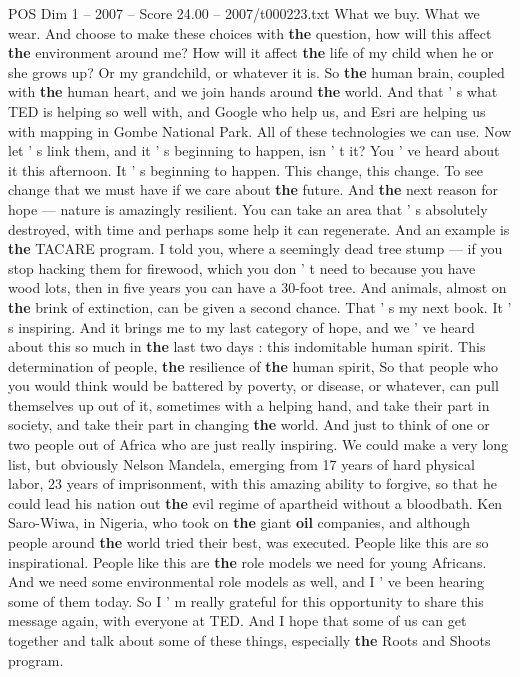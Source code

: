 \begin{textsample}{POS Dim 1 – 2007 – Score 24.00 – 2007/t000223.txt}
What we buy.
What we wear.
And choose to make these choices with \textbf{the} question, how will this affect \textbf{the} environment around me?
How will it affect \textbf{the} life of my child when he or she grows up?
Or my grandchild, or whatever it is.
So \textbf{the} human brain, coupled with \textbf{the} human heart, and we join hands around \textbf{the} world.
And that ' s what TED is helping so well with, and Google who help us, and Esri are helping us with mapping in Gombe National Park.
All of these technologies we can use.
Now let ' s link them, and it ' s beginning to happen, isn ' t it?
You ' ve heard about it this afternoon.
It ' s beginning to happen.
This change, this change.
To see change that we must have if we care about \textbf{the} future.
And \textbf{the} next reason for hope — nature is amazingly resilient.
You can take an area that ' s absolutely destroyed, with time and perhaps some help it can regenerate.
And an example is \textbf{the} TACARE program.
I told you, where a seemingly dead tree stump — if you stop hacking them for firewood, which you don ' t need to because you have wood lots, then in five years you can have a 30-foot tree.
And animals, almost on \textbf{the} brink of extinction, can be given a second chance.
That ' s my next book.
It ' s inspiring.
And it brings me to my last category of hope, and we ' ve heard about this so much in \textbf{the} last two days : this indomitable human spirit.
This determination of people, \textbf{the} resilience of \textbf{the} human spirit, So that people who you would think would be battered by poverty, or disease, or whatever, can pull themselves up out of it, sometimes with a helping hand, and take their part in society, and take their part in changing \textbf{the} world.
And just to think of one or two people out of Africa who are just really inspiring.
We could make a very long list, but obviously Nelson Mandela, emerging from 17 years of hard physical labor, 23 years of imprisonment, with this amazing ability to forgive, so that he could lead his nation out \textbf{the} evil regime of apartheid without a bloodbath.
Ken Saro-Wiwa, in Nigeria, who took on \textbf{the} giant \textbf{oil} companies, and although people around \textbf{the} world tried their best, was executed.
People like this are so inspirational.
People like this are \textbf{the} role models we need for young Africans.
And we need some environmental role models as well, and I ' ve been hearing some of them today.
So I ' m really grateful for this opportunity to share this message again, with everyone at TED.
And I hope that some of us can get together and talk about some of these things, especially \textbf{the} Roots and Shoots program.

\end{textsample}
